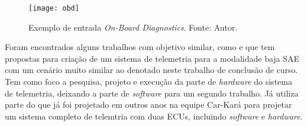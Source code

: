 \begin{figure}[!htb]
	\centering
		\texttt{[image: obd]}
		\caption{Exemplo de entrada \textit{On-Board Diagnostics}. Fonte: Autor.}
		\label{fig:obd}
	\end{figure}

Foram encontrados alguns trabalhos com objetivo similar, como \cite{Dias2010} e \cite{Nunes2016} que tem propostas para criação de um sistema de telemetria para a modalidade baja SAE com um cenário muito similar ao denotado neste trabalho de conclusão de curso. \cite{Dias2010} Tem como foco a pesquisa, projeto e execução da parte de \textit{hardware} do sistema de telemetria, deixando a parte de \textit{software} para um segundo trabalho. Já \cite{Nunes2016} utiliza parte do que já foi projetado em outros anos na equipe Car-Kará para projetar um sistema completo de telemtria com duas ECUs, incluindo \textit{software} e \textit{hardware}.  

